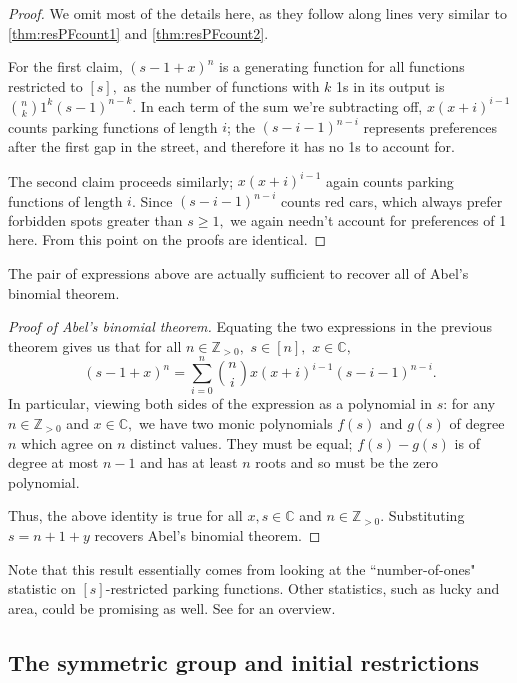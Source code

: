 \documentclass[12pt]{article}
\begin{document}
\begin{proof}
    We omit most of the details here, as they follow along lines very similar to \cref{thm:resPFcount1} and \cref{thm:resPFcount2}.
    
    For the first claim, $(s-1+x)^n$ is a generating function for all functions restricted to $[s],$ as the number of functions with $k$ 1s in its output is $\binom{n}{k}1^k(s-1)^{n-k}.$ In each term of the sum we're subtracting off, $x(x+i)^{i-1}$  counts parking functions of length $i$; the $(s-i-1)^{n-i}$ represents preferences after the first gap in the street, and therefore it has no 1s to account for.

    The second claim proceeds similarly; $x(x+i)^{i-1}$ again counts parking functions of length $i$. Since $(s-i-1)^{n-i}$ counts red cars, which always prefer forbidden spots greater than $s\ge1,$ we again needn't account for preferences of 1 here. From this point on the proofs are identical.
\end{proof}

The pair of expressions above are actually sufficient to recover all of Abel's binomial theorem.

\begin{proof}[Proof of Abel's binomial theorem]
	Equating the two expressions in the previous theorem gives us that for all $n\in\mathbb{Z}_{>0},$ $s\in [n],$ $x\in\mathbb{C},$
	\[
		(s-1+x)^{n} = \sum_{i = 0}^{n} \binom{n}{i} x(x + i)^{i - 1} (s - i - 1)^{n - i}.
	\]
In particular, viewing both sides of the expression as a polynomial in $s$: for any $n\in\mathbb{Z}_{>0}$ and $x\in\mathbb{C},$ we have two monic polynomials $f(s)$ and $g(s)$ of degree $n$ which agree on $n$ distinct values. They must be equal; $f(s)-g(s)$ is of degree at most $n-1$ and has at least $n$ roots and so must be the zero polynomial.

Thus, the above identity is true for all $x,s\in\mathbb{C}$ and $n\in\mathbb{Z}_{>0}$. Substituting $s=n+1+y$ recovers Abel's binomial theorem.
\end{proof}

Note that this result essentially comes from looking at the ``number-of-ones" statistic on $[s]$-restricted parking functions. Other statistics, such as lucky and area, could be promising as well. See \cite{yan-survey-2015} for an overview.

\subsection{The symmetric group and initial restrictions}
\end{document}
